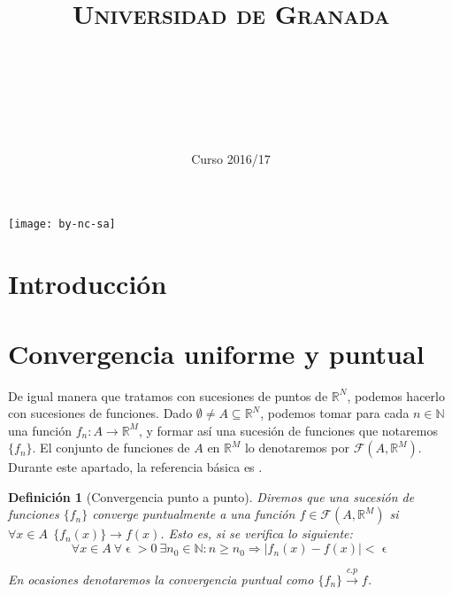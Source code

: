 \documentclass[11pt, a4paper]{article}
\title{
  \normalfont \normalsize 
  \textsc{Universidad de Granada} \\ [25pt]    %
  \horrule{0.5pt} \\[0.4cm] %
  \huge \subject\\ %
  \horrule{2pt} \\[0.5cm] %
}
\author{\Large{\docauthor}}
\date{\vspace{-1.5em} \normalsize Curso 2016/17}
\let\epsilon\upvarepsilon
\newcommand{\R}{\mathbb{R}}
\newcommand{\fn}{\{f_n\}}
\theoremstyle{theorem-style}
\theoremstyle{definition-style}
\newtheorem{ndef}{Definición}[section]
\theoremstyle{remark-style}
\theoremstyle{example-style}
\begin{document}
\maketitle  %
\vfill
\begin{center}
\texttt{[image: by-nc-sa]}  %
\end{center}
\newpage
\tableofcontents    %
\newpage



\section*{Introducción}


\newpage


\section{Convergencia uniforme y puntual}
De igual manera que tratamos con sucesiones de puntos de $\R^N$, podemos hacerlo con sucesiones de funciones. Dado $\emptyset \ne A \subseteq \R^N$, podemos tomar para cada $n \in \mathbb{N}$ una función $f_n : A \to \R^M$, y formar así una sucesión de funciones que notaremos $\{f_n\}$. El conjunto de funciones de $A$ en $\mathbb{R}^M$ lo denotaremos por $\mathcal{F}(A,\mathbb{R}^M)$. Durante este apartado, la referencia básica es \cite[Capítulo 5]{marsden}.

\begin{ndef}[Convergencia punto a punto] Diremos que una sucesión de funciones $\fn$ converge puntualmente a una función $f\in \mathcal{F}(A,\mathbb{R}^M)$ si $\forall x \in A \ \ \{f_n(x)\} \rightarrow f(x)$. Esto es, si se verifica lo siguiente:
	\[
		\forall x\in A\ \forall \epsilon > 0\ \exists n_0 \in \mathbb{N}: n \ge n_0 \Rightarrow |f_n(x)-f(x)| < \epsilon 
	\]
	
En ocasiones denotaremos la convergencia puntual como $\fn \xrightarrow {c.p} f$. 
\end{ndef}
\end{document}
